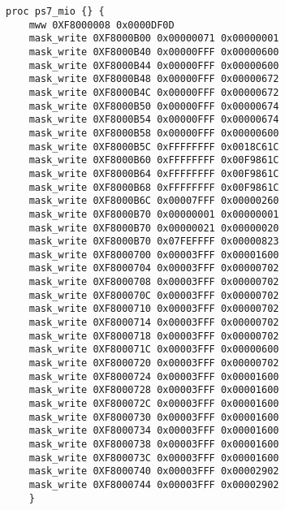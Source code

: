 \begin{lstlisting}
proc ps7_mio {} {
    mww 0XF8000008 0x0000DF0D
    mask_write 0XF8000B00 0x00000071 0x00000001
    mask_write 0XF8000B40 0x00000FFF 0x00000600
    mask_write 0XF8000B44 0x00000FFF 0x00000600
    mask_write 0XF8000B48 0x00000FFF 0x00000672
    mask_write 0XF8000B4C 0x00000FFF 0x00000672
    mask_write 0XF8000B50 0x00000FFF 0x00000674
    mask_write 0XF8000B54 0x00000FFF 0x00000674
    mask_write 0XF8000B58 0x00000FFF 0x00000600
    mask_write 0XF8000B5C 0xFFFFFFFF 0x0018C61C
    mask_write 0XF8000B60 0xFFFFFFFF 0x00F9861C
    mask_write 0XF8000B64 0xFFFFFFFF 0x00F9861C
    mask_write 0XF8000B68 0xFFFFFFFF 0x00F9861C
    mask_write 0XF8000B6C 0x00007FFF 0x00000260
    mask_write 0XF8000B70 0x00000001 0x00000001
    mask_write 0XF8000B70 0x00000021 0x00000020
    mask_write 0XF8000B70 0x07FEFFFF 0x00000823
    mask_write 0XF8000700 0x00003FFF 0x00001600
    mask_write 0XF8000704 0x00003FFF 0x00000702
    mask_write 0XF8000708 0x00003FFF 0x00000702
    mask_write 0XF800070C 0x00003FFF 0x00000702
    mask_write 0XF8000710 0x00003FFF 0x00000702
    mask_write 0XF8000714 0x00003FFF 0x00000702
    mask_write 0XF8000718 0x00003FFF 0x00000702
    mask_write 0XF800071C 0x00003FFF 0x00000600
    mask_write 0XF8000720 0x00003FFF 0x00000702
    mask_write 0XF8000724 0x00003FFF 0x00001600
    mask_write 0XF8000728 0x00003FFF 0x00001600
    mask_write 0XF800072C 0x00003FFF 0x00001600
    mask_write 0XF8000730 0x00003FFF 0x00001600
    mask_write 0XF8000734 0x00003FFF 0x00001600
    mask_write 0XF8000738 0x00003FFF 0x00001600
    mask_write 0XF800073C 0x00003FFF 0x00001600
    mask_write 0XF8000740 0x00003FFF 0x00002902
    mask_write 0XF8000744 0x00003FFF 0x00002902
    }


\end{lstlisting}
